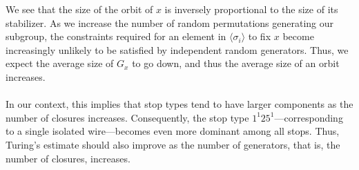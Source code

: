 \noindent We see that the size of the orbit of $x$ is inversely
proportional to the size of its stabilizer. As we increase the number
of random permutations generating our subgroup, the  constraints
required for an element in $\langle\sigma_i\rangle$ to fix $x$ become
increasingly unlikely to be
satisfied by independent random generators. Thus, we expect the
average size of $G_x$ to go down, and thus the average size of an
orbit increases.
\\\\In our context, this implies that stop types tend to have larger
components as the number of closures increases. Consequently, the
stop type $1^1 25^1$—corresponding to a single isolated wire—becomes
even more dominant among all stops. Thus, Turing's estimate should
also improve as the number of generators, that is, the number of
closures, increases.

